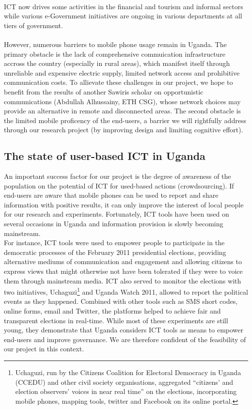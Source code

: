 \documentclass[11pt]{article}
\begin{document}
\\
ICT now drives some activities in the financial and tourism and informal sectors while various e-Government initiatives are ongoing in various departments at all tiers of government\cite{Nora10}\cite{Post11}. 
\\\\
However, numerous barriers to mobile phone usage remain in Uganda. The primary obstacle is the lack of comprehensive commuication infrastructure accross the country (especially in rural areas), which manifest itself through unreliable and expensive electric supply, limited network access and prohibitive communication costs. To allievate these challenges in our project, we hope to benefit from the results of another Sawiris scholar on opportunistic communications (Abdullah Alhussainy, ETH CSG), whose network choices may provide an alternative in remote and disconnected areas. The second obstacle is the limited mobile proficency of the end-users, a barrier we will rightfully address through our research project (by improving design and limiting cognitive effort). 

\subsection{The state of user-based ICT in Uganda}
An important success factor for our project is the degree of awareness of the population on the potential of ICT for used-based actions (crowdsourcing). If end-users are aware that mobile phones can be used to report and share information with positive results, it can only improve the interest of local people for our research and experiments. Fortunately, ICT tools have been used on several occasions in Uganda and information provision is slowly becoming mainstream. 
\\
For instance, ICT tools were used to empower people to participate in the democratic processes of the February 2011 presidential elections\cite{Post11}, providing alternative mediums of communication and engagement and allowing citizens to express views that might otherwise not have been tolerated if they were to voice them through mainstream media\cite{Post11}\cite{ Ashnah12}. ICT also served to monitor the elections with two initiatives, Uchaguzi\footnote{Uchaguzi, run by the Citizens Coalition for Electoral Democracy in Uganda (CCEDU) and other civil society organisations, aggregated “citizens’ and election observers’ voices in near real time” on the elections, incorporating mobile phones, mapping tools, twitter and Facebook on its online portal\cite{Post11}.} and Uganda Watch 2011, allowed to report the political events as they happened. Combined with other tools such as SMS short codes, online forms, email and Twitter, the platforms helped to achieve fair and transparent elections in real-time\cite{Post11}\cite{ Ashnah12}.
While most of these experiments are still young, they demonstrate that Uganda considers ICT tools as means to empower end-users and improve governance. We are therefore confident of the feasibility of our project in this context.
\end{document}
